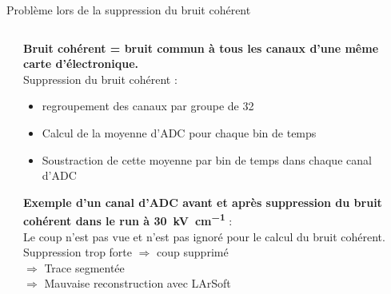 \begin{frame}{Problème lors de la suppression du bruit cohérent}
\begin{scriptsize}
\begin{columns}
\begin{column}{0.45\textwidth}
                 \end{column}
                \begin{column}{0.55\textwidth}
                    \textbf{Bruit cohérent = bruit commun à tous les canaux d'une même carte d'électronique.} \\\vspace{0.3cm}
                    Suppression du bruit cohérent :
                    \begin{itemize}
                        \item regroupement des canaux par groupe de 32
                        \item Calcul de la moyenne d'ADC pour chaque bin de temps
                        \item Soustraction de cette moyenne par bin de temps dans chaque canal d'ADC
                    \end{itemize} 
                    \vspace{0.3cm}
                    \textbf{ Exemple d'un canal d'ADC avant et après suppression du bruit cohérent dans le run à \SI{30}{\kilo\volt\per\centi\meter} }: \\Le coup n'est pas vue et n'est pas ignoré pour le calcul du bruit cohérent. \\
                     Suppression trop forte $\Rightarrow$ coup supprimé \\
                    $\Rightarrow$ Trace segmentée \\
                    $\Rightarrow$ Mauvaise reconstruction avec LArSoft \\
                \end{column}
            \end{columns}
        \end{scriptsize}
    \end{frame}

